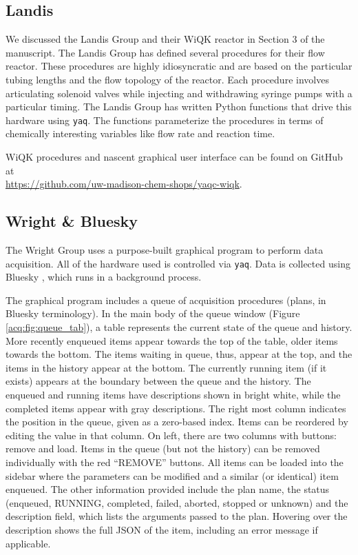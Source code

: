\documentclass[11pt, full]{article}
\newcommand\yaq{\texttt{yaq}}
\begin{document}
\clearpage

\subsection{Landis}

We discussed the Landis Group and their WiQK reactor in Section 3 of the manuscript.
The Landis Group has defined several procedures for their flow reactor.
These procedures are highly idiosyncratic and are based on the particular tubing lengths and the flow topology of the reactor.
Each procedure involves articulating solenoid valves while injecting and withdrawing syringe pumps with a particular timing.
The Landis Group has written Python functions that drive this hardware using \yaq{}.
The functions parameterize the procedures in terms of chemically interesting variables like flow rate
and reaction time.

WiQK procedures and nascent graphical user interface can be found on GitHub at \\ \url{https://github.com/uw-madison-chem-shops/yaqc-wiqk}.

\subsection{Wright \& Bluesky}

The Wright Group uses a purpose-built graphical program to perform data acquisition.
All of the hardware used is controlled via \yaq{}.
Data is collected using Bluesky \cite{AllanDanielB2019a}, which runs in a background process.

The graphical program includes a queue of acquisition procedures (plans, in Bluesky terminology).
In the main body of the queue window (Figure \ref{acq:fig:queue_tab}), a table represents the current state of the queue and history.
More recently enqueued items appear towards the top of the table, older items towards the bottom.
The items waiting in queue, thus, appear at the top, and the items in the history appear at the bottom.
The currently running item (if it exists) appears at the boundary between the queue and the history.
The enqueued and running items have descriptions shown in bright white, while the completed items appear with gray descriptions.
The right most column indicates the position in the queue, given as a zero-based index.
Items can be reordered by editing the value in that column.
On left, there are two columns with buttons: remove and load.
Items in the queue (but not the history) can be removed individually with the red ``REMOVE'' buttons.
All items can be loaded into the sidebar where the parameters can be modified and a similar (or identical) item enqueued.
The other information provided include the plan name, the status (enqueued, RUNNING, completed, failed, aborted, stopped or unknown) and the description field, which lists the arguments passed to the plan.
Hovering over the description shows the full JSON of the item, including an error message if applicable.
\end{document}
